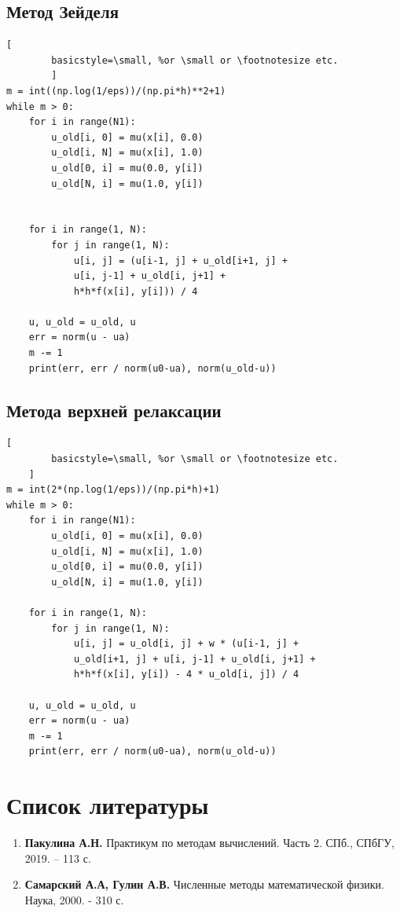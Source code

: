\documentclass[a4paper, 12pt]{article}
\begin{document}
	\subsection{Метод Зейделя}
	\lstset{language=Python}
	\begin{lstlisting}[
		basicstyle=\small, %or \small or \footnotesize etc.
		]
m = int((np.log(1/eps))/(np.pi*h)**2+1)
while m > 0:
	for i in range(N1):
		u_old[i, 0] = mu(x[i], 0.0)
		u_old[i, N] = mu(x[i], 1.0)
		u_old[0, i] = mu(0.0, y[i])
		u_old[N, i] = mu(1.0, y[i])


	for i in range(1, N):
		for j in range(1, N):
			u[i, j] = (u[i-1, j] + u_old[i+1, j] + 
			u[i, j-1] + u_old[i, j+1] + 
			h*h*f(x[i], y[i])) / 4
	
	u, u_old = u_old, u
	err = norm(u - ua)
	m -= 1
	print(err, err / norm(u0-ua), norm(u_old-u))
	\end{lstlisting}
\newpage
	\subsection{Метода верхней релаксации}
	\lstset{language=Python}
	\begin{lstlisting}[
		basicstyle=\small, %or \small or \footnotesize etc.
	]
m = int(2*(np.log(1/eps))/(np.pi*h)+1)
while m > 0:
	for i in range(N1):
		u_old[i, 0] = mu(x[i], 0.0)
		u_old[i, N] = mu(x[i], 1.0)
		u_old[0, i] = mu(0.0, y[i]) 
		u_old[N, i] = mu(1.0, y[i])
	
	for i in range(1, N):
		for j in range(1, N):
			u[i, j] = u_old[i, j] + w * (u[i-1, j] + 
			u_old[i+1, j] + u[i, j-1] + u_old[i, j+1] + 
			h*h*f(x[i], y[i]) - 4 * u_old[i, j]) / 4 
	
	u, u_old = u_old, u
	err = norm(u - ua)
	m -= 1
	print(err, err / norm(u0-ua), norm(u_old-u))
 	\end{lstlisting}
	\newpage
	\section{Список литературы}
	
	\begin{enumerate}
		\item \textbf{Пакулина А.Н.} Практикум по методам вычислений. Часть 2. СПб., СПбГУ, 2019. – 113 с.
		\item \textbf{Самарский А.А, Гулин А.В.} Численные методы математической физики. Наука, 2000. - 310 с.
	\end{enumerate}
	
	
	
\end{document}
